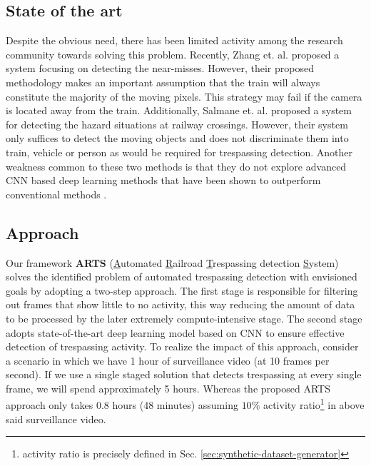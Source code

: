 \subsection{State of the art}
Despite the obvious need, there has been limited activity among the research community towards solving this problem. Recently, Zhang et. al. \cite{zhang2018automated} proposed a system focusing on detecting the near-misses. However, their proposed methodology makes an important assumption that the train will always constitute the majority of the moving pixels. This strategy may fail if the camera is located away from the train. Additionally, Salmane et. al. \cite{salmane2015video} proposed a system for detecting the hazard situations at railway crossings. However, their system only suffices to detect the moving objects and does not discriminate them into train, vehicle or person as would be required for trespassing detection. Another weakness common to these two methods is that they do not explore advanced CNN based deep learning methods that have been shown to outperform conventional methods \cite{krizhevsky2012imagenet}. 

\subsection{Approach}
Our framework \textbf{ARTS} (\underline{A}utomated \underline{R}ailroad \underline{T}respassing detection \underline{S}ystem) solves the identified problem of automated trespassing detection with envisioned goals by adopting a two-step approach. The first stage is responsible for filtering out frames that show little to no activity, this way reducing the amount of data to be processed by the later extremely compute-intensive stage. The second stage adopts state-of-the-art deep learning model based on CNN to ensure effective detection of trespassing activity. To realize the impact of this approach, consider a scenario in which we have 1 hour of surveillance video (at 10 frames per second). If we use a single staged solution that detects trespassing at every single frame, we will spend approximately 5 hours. Whereas the proposed ARTS approach only takes 0.8 hours (48 minutes) assuming $10\%$ activity ratio\footnote{activity ratio is precisely defined in Sec. \ref{sec:synthetic-dataset-generator}} in above said surveillance video. 
